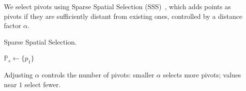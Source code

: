 We select pivots using Sparse Spatial Selection (SSS)~\cite{pedreira2007}, which adds points as pivots if they are sufficiently distant from existing ones, controlled by a distance factor $\alpha$.

\begin{algorithm}
    \caption{Sparse Spatial Selection.}
    \label{alg:sss}
    $\mathbb{P}_s \gets \{p_1\}$ \\
\end{algorithm}

Adjusting $\alpha$ controls the number of pivots: smaller $\alpha$ selects more pivots; values near $1$ select fewer.

